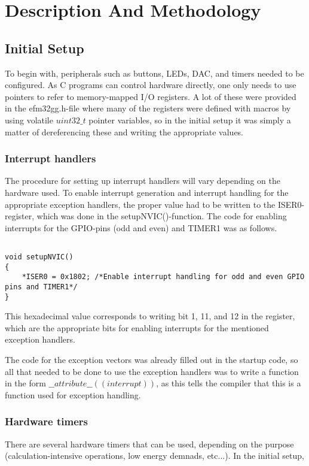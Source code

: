 \section{Description And Methodology}


\subsection{Initial Setup}
To begin with, peripherals such as buttons, LEDs, DAC, and timers needed to be configured. As C programs can control hardware directly, one only needs to use pointers to refer to memory-mapped I/O registers. A lot of these were provided in the efm32gg.h-file where many of the registers were defined with macros by using volatile $uint32\_t$ pointer variables, so in the initial setup it was simply a matter of dereferencing these and writing the appropriate values.


\subsubsection{Interrupt handlers}
The procedure for setting up interrupt handlers will vary depending on the hardware used. To enable interrupt generation and interrupt handling for the appropriate exception handlers, the proper value had to be written to the ISER0-register, which was done in the setupNVIC()-function. The code for enabling interrupts for the GPIO-pins (odd and even) and TIMER1 was as follows.

\begin{lstlisting}

void setupNVIC()
{
 	*ISER0 = 0x1802; /*Enable interrupt handling for odd and even GPIO pins and TIMER1*/
}

\end{lstlisting} 
This hexadecimal value corresponds to writing bit 1, 11, and 12 in the register, which are the appropriate bits for enabling interrupts for the mentioned exception handlers.

The code for the exception vectors was already filled out in the startup code, so all that needed to be done to use the exception handlers was to write a function in the form $\_\_attribute\_\_ ((interrupt))$, as this tells the compiler that this is a function used for exception handling.


\subsubsection{Hardware timers}
There are several hardware timers that can be used, depending on the purpose (calculation-intensive operations, low energy demnads, etc...). In the initial setup, 


